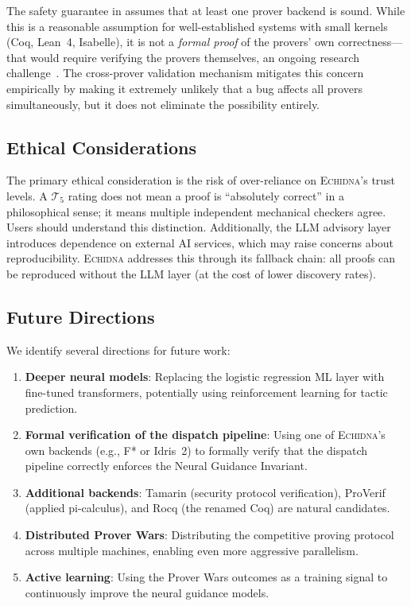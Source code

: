 \documentclass[11pt,a4paper]{article}
\newcommand{\echidna}{\textsc{Echidna}}
\newcommand{\trustlevel}[1]{\ensuremath{\mathcal{T}_{#1}}}
\begin{document}
The safety guarantee in  assumes that at least one prover
backend is sound. While this is a reasonable assumption for well-established
systems with small kernels (Coq, Lean~4, Isabelle), it is not a \emph{formal
proof} of the provers' own correctness---that would require verifying the
provers themselves, an ongoing research challenge~\citep{verified-coq}.
The cross-prover validation mechanism mitigates this concern empirically by
making it extremely unlikely that a bug affects all provers simultaneously,
but it does not eliminate the possibility entirely.

\subsection{Ethical Considerations}

The primary ethical consideration is the risk of over-reliance on
\echidna{}'s trust levels. A $\trustlevel{5}$ rating does not mean a proof is
``absolutely correct'' in a philosophical sense; it means multiple independent
mechanical checkers agree. Users should understand this distinction.
Additionally, the LLM advisory layer introduces dependence on external AI
services, which may raise concerns about reproducibility. \echidna{} addresses
this through its fallback chain: all proofs can be reproduced without the LLM
layer (at the cost of lower discovery rates).

\subsection{Future Directions}

We identify several directions for future work:

\begin{enumerate}
  \item \textbf{Deeper neural models}: Replacing the logistic regression ML
  layer with fine-tuned transformers, potentially using reinforcement learning
  for tactic prediction.

  \item \textbf{Formal verification of the dispatch pipeline}: Using one of
  \echidna{}'s own backends (e.g., F* or Idris~2) to formally verify that the
  dispatch pipeline correctly enforces the Neural Guidance Invariant.

  \item \textbf{Additional backends}: Tamarin (security protocol verification),
  ProVerif (applied pi-calculus), and Rocq (the renamed Coq) are natural
  candidates.

  \item \textbf{Distributed Prover Wars}: Distributing the competitive proving
  protocol across multiple machines, enabling even more aggressive
  parallelism.

  \item \textbf{Active learning}: Using the Prover Wars outcomes as a training
  signal to continuously improve the neural guidance models.
\end{enumerate}
\end{document}

